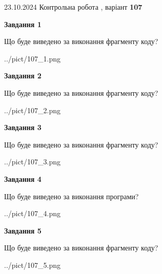 \documentclass[12pt, ukrainian]{article}
\begin{document}
{\Large{23.10.2024 Контрольна робота , варіант  \No \textbf { 107 }\par}}
{
\begin {large}
{\begin {center}\textbf{Завдання 1}\end {center}}

Що буде виведено за виконання фрагменту коду?\par
\begin{center}
	{../pict/107_1.png}
\end{center}
\newpage

{\begin {center}\textbf{Завдання 2}\end {center}}

Що буде виведено за виконання фрагменту коду?\par
\begin{center}
	{../pict/107_2.png}
\end{center}
\newpage

{\begin {center}\textbf{Завдання 3}\end {center}}

Що буде виведено за виконання фрагменту коду?\par
\begin{center}
	{../pict/107_3.png}
\end{center}
\newpage

{\begin {center}\textbf{Завдання 4}\end {center}}

Що буде виведено за виконання програми?\par
\begin{center}
	{../pict/107_4.png}
\end{center}
\newpage

{\begin {center}\textbf{Завдання 5}\end {center}}

Що буде виведено за виконання фрагменту коду?\par
\begin{center}
	{../pict/107_5.png}
\end{center}
\newpage


\end{large}}
\end{document}
